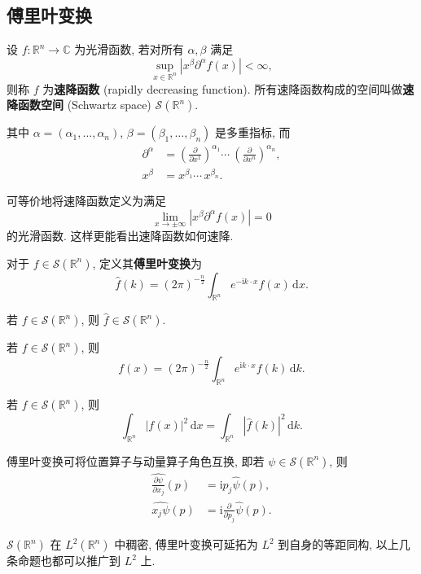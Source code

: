 \subsection{傅里叶变换}
\begin{definition}[速降函数空间]
    设 $ f:\mathbb{R}^n\to\mathbb{C} $ 为光滑函数, 若对所有 $ \alpha,\beta $ 满足
    \[ \sup_{x\in\mathbb{R}^n}\left| x^\beta\partial^\alpha f(x) \right|<\infty, \]
    则称 $ f $ 为{\bf 速降函数} (rapidly decreasing function). 所有速降函数构成的空间叫做{\bf 速降函数空间} (Schwartz space) $ \mathcal{S}(\mathbb{R}^n) $. 
    
    其中 $ \alpha=(\alpha_1,\dots,\alpha_n) $, $ \beta=(\beta_1,\dots,\beta_n) $ 是多重指标, 而
    \begin{align*}
        \partial^\alpha &= \left( \frac{\partial}{\partial x^1} \right)^{\alpha_1}\cdots\ \left( \frac{\partial}{\partial x^n} \right)^{\alpha_n},\\ 
        x^\beta &= x^{\beta_1}\cdots\,x^{\beta_n}.
    \end{align*}
\end{definition}
\begin{remark}
    可等价地将速降函数定义为满足
    \[ \lim_{x\to\pm\infty}\left| x^{\beta}\partial^{\alpha}f(x) \right|=0 \]
    的光滑函数. 这样更能看出速降函数如何速降.
\end{remark}
\begin{definition}[傅里叶变换]
    对于 $ f\in\mathcal{S}(\mathbb{R}^n) $, 定义其{\bf 傅里叶变换}为
    \[ \hat{f}(k)=(2\pi)^{-\frac{n}{2}}\int_{\mathbb{R}^n}e^{-\mathrm{i}k\cdot x}f(x)\,\mathrm{d}x. \]
\end{definition}
\begin{proposition}
    若 $ f\in\mathcal{S}(\mathbb{R}^n) $, 则 $ \hat{f}\in\mathcal{S}(\mathbb{R}^n) $.
\end{proposition}
\begin{proposition}[逆傅里叶变换]
    若 $ f\in\mathcal{S}(\mathbb{R}^n) $, 则
    \[ f(x)=(2\pi)^{-\frac{n}{2}}\int_{\mathbb{R}^n}e^{\mathrm{i}k\cdot x}f(k)\,\mathrm{d}k. \]
\end{proposition}
\begin{proposition}[帕塞瓦尔定理]
    若 $ f\in\mathcal{S}(\mathbb{R}^n) $, 则
    \[ \int_{\mathbb{R}^n}|f(x)|^2\,\mathrm{d}x=\int_{\mathbb{R}^n}|\hat{f}(k)|^2\,\mathrm{d}k. \]
\end{proposition}

\begin{proposition}
    傅里叶变换可将位置算子与动量算子角色互换, 即若 $ \psi\in\mathcal{S}(\mathbb{R}^n) $, 则
    \begin{align*}
        \widehat{\frac{\partial\psi}{\partial x_j}}(p)&=\mathrm{i}p_j\hat{\psi}(p),\\ 
        \widehat{x_j\psi}(p)&=\mathrm{i}\frac{\partial}{\partial p_j}\hat{\psi}(p).
    \end{align*}
\end{proposition}

\begin{remark}
    $ \mathcal{S}(\mathbb{R}^n) $ 在 $ L^2(\mathbb{R}^n) $ 中稠密, 傅里叶变换可延拓为 $ L^2 $ 到自身的等距同构, 以上几条命题也都可以推广到 $ L^2 $ 上.
\end{remark}